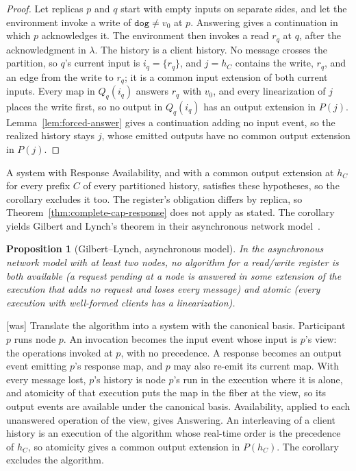\documentclass[sigconf]{cidr-2027}
\newtheorem{proposition}{Proposition}
\theoremstyle{remark}
\newcommand{\indesc}{input extension\xspace} %
\newcommand{\outnoun}{output extension\xspace}%
\newcommand{\fiber}[1]{P(#1)}
\newcommand{\dog}{\texttt{dog}}
\begin{document}
\color{blue!70!black}\begin{proof}
Let replicas $p$ and $q$ start with empty inputs on separate sides, and let
the environment invoke a write of $\dog\neq v_0$ at $p$.  Answering gives a
continuation in which $p$ acknowledges it.  The environment then invokes a read
$r_q$ at $q$, after the acknowledgment in $\lambda$.  The history is a client history.  No message
crosses the partition, so $q$'s current input is $i_q=\{r_q\}$, and $j=h_C$
contains the write, $r_q$, and an edge from the write to $r_q$; it is a common
\indesc of both current inputs.  Every map in $Q_q(i_q)$ answers $r_q$ with
$v_0$, and every linearization of $j$ places the write first, so no output in
$Q_q(i_q)$ has an \outnoun in $\fiber{j}$.  Lemma~\ref{lem:forced-answer}
gives a continuation adding no input event, so the realized history stays
$j$, whose emitted outputs have no common \outnoun in $\fiber{j}$.\color{black}
\end{proof}

A system with Response Availability, and with a common \outnoun at $h_C$ for
every prefix $C$ of every partitioned history, satisfies these hypotheses, so
the corollary excludes it too.  The register's obligation differs by replica, so
Theorem~\ref{thm:complete-cap-response} does not apply as stated.  The
corollary yields Gilbert and Lynch's theorem in their asynchronous network
model~\cite{gilbert2002cap}.

\begin{proposition}[Gilbert--Lynch, asynchronous model]
\label{prop:gl-async}
In the asynchronous network model with at least two nodes, no algorithm for a
read/write register is both available (a request pending at a node is
answered in some extension of the execution that adds no request and loses
every message) and atomic (every execution with well-formed clients has a
linearization).
\end{proposition}



{\footnotesize\color{black!50}\noindent\textsf{[was]} Translate the algorithm into a system with the canonical basis.  Participant
$p$ runs node $p$.  An invocation becomes the input event whose input is $p$'s
view: the operations invoked at $p$, with no precedence.  A response becomes an
output event emitting $p$'s response map, and $p$ may also re-emit its current
map.  With every message lost, $p$'s history is node $p$'s run in the
execution where it is alone, and atomicity of that execution puts the map in
the fiber at the view, so its output events are available under the canonical
basis.  Availability, applied
to each unanswered operation of the view, gives Answering.  An interleaving of
a client history is an execution of the algorithm whose real-time order is the
precedence of $h_C$, so atomicity gives a common \outnoun in $\fiber{h_C}$.
The corollary excludes the algorithm.\par}
\end{document}
